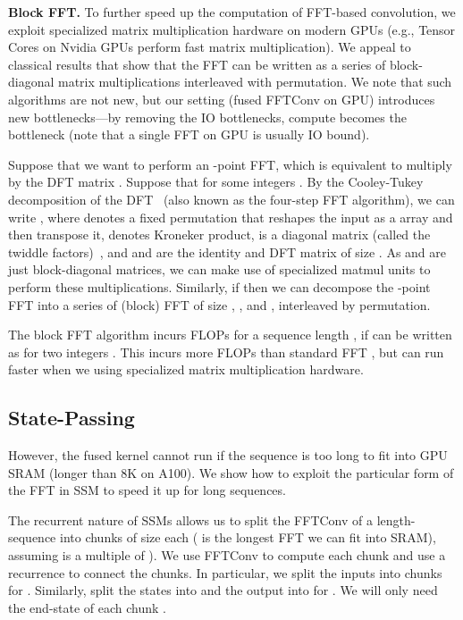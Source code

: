 \documentclass{article}
\begin{document}
\textbf{Block FFT.}
To further speed up the computation of FFT-based convolution, we exploit specialized matrix multiplication hardware on modern GPUs
(e.g., Tensor Cores on Nvidia GPUs perform fast  matrix multiplication).
We appeal to classical results that show that the FFT can be written as a series of block-diagonal matrix
multiplications interleaved with permutation.
We note that such algorithms are not new, but our setting (fused FFTConv on GPU) introduces new bottlenecks---by removing the IO bottlenecks, compute becomes the bottleneck (note that a single FFT on GPU is usually IO bound).

Suppose that we want to perform an -point FFT, which is equivalent to
multiply by the DFT matrix .
Suppose that  for some integers .
By the Cooley-Tukey decomposition of the DFT~\citep{cooley1965an,
  bailey1990ffts} (also known as the four-step FFT algorithm),
we can write ,
where  denotes a fixed permutation that reshapes the input as a 
array and then transpose it,  denotes Kroneker product,  is a 
diagonal matrix (called the twiddle factors)~\citep{dao2022monarch}, and  and  are the identity and DFT matrix of size .
As  and  are just block-diagonal matrices,
we can make use of specialized matmul units to perform these multiplications.
Similarly, if  then we can decompose the -point FFT into a
series of (block) FFT of size , , and , interleaved by
permutation.

The block FFT algorithm incurs  FLOPs for a sequence length , if  can be written as  for two integers .
This incurs more FLOPs than standard FFT , but can run faster when
we using specialized matrix multiplication hardware.

\subsection{State-Passing}
However, the fused kernel cannot run if the sequence is too long to fit into GPU SRAM (longer than 8K on A100).
We show how to exploit the particular form of the FFT in SSM to speed it up for long
sequences.

The recurrent nature of SSMs allows us to split the FFTConv of a length- sequence into chunks of size  each ( is the longest FFT we can fit into SRAM), assuming  is a multiple of ).
We use FFTConv to compute each chunk and use a recurrence to connect the chunks.
In particular, we split the inputs  into  chunks  for .
Similarly, split the states  into  and the output  into  for .
We will only need the end-state  of each chunk .
\end{document}
